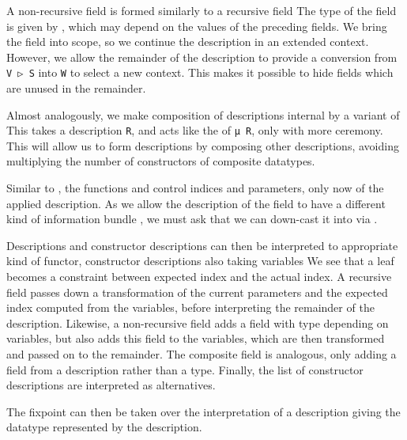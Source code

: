 A non-recursive field is formed similarly to a recursive field
The type of the field is given by , which may depend on the values of the preceding fields. We bring the field into scope, so we continue the description in an extended context. However, we allow the remainder of the description to provide a conversion from \texttt{V ▷ S} into \texttt{W} to select a new context. This makes it possible to hide fields which are unused in the remainder.

Almost analogously, we make composition of descriptions internal by a variant of 
This takes a description \texttt{R}, and acts like the  of \texttt{μ R}, only with more ceremony. This will allow us to form descriptions by composing other descriptions, avoiding multiplying the number of constructors of composite datatypes.

Similar to , the functions  and  control indices and parameters, only now of the applied description. As we allow the description  of the field to have a different kind of information bundle , we must ask that we can down-cast it into  via . 

Descriptions and constructor descriptions can then be interpreted to appropriate kind of functor, constructor descriptions also taking variables
\hypertarget{desc-desc-interpretation}{}
We see that a leaf becomes a constraint between expected index and the actual index. A recursive field passes down a transformation of the current parameters and the expected index computed from the variables, before interpreting the remainder of the description. Likewise, a non-recursive field adds a field with type depending on variables, but also adds this field to the variables, which are then transformed and passed on to the remainder. The composite field is analogous, only adding a field from a description rather than a type. Finally, the list of constructor descriptions are interpreted as alternatives.

The fixpoint can then be taken over the interpretation of a description
giving the datatype represented by the description.

